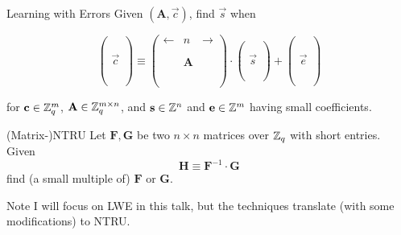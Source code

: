 \documentclass[xcolor=table,10pt,aspectratio=169]{beamer}
\begin{document}
\begin{frame}[label={sec:org35ba1be}]{Learning with Errors}
Given \((\mathbf{A},\vec{c})\), find \(\vec{s}\) when

\[
\left(\begin{array}{c}
\\
\\
\\ 
\vec{c} \\
\\
\\
\\
\end{array} \right) \equiv \left(
\begin{array}{ccc}
\leftarrow & n & \rightarrow \\
\\
\\ 
& \mathbf{A} & \\
\\
\\
\\
\end{array} \right) \cdot \left( \begin{array}{c}
\\\
\\
\vec{s} \\
\\
\\
\end{array} \right) + \left(
\begin{array}{c}
\\
\\
\\ 
\vec{e} \\
\\
\\
\\
\end{array} 
\right)
\]

for \(\mathbf{c} \in \mathbb{Z}_q^{m}\), \(\mathbf{A} \in \mathbb{Z}_q^{m \times n}\), and \(\mathbf{s} \in \mathbb{Z}^{n}\) and \(\mathbf{e} \in \mathbb{Z}^{m}\) having small coefficients.
\end{frame}

\begin{frame}[label={sec:orgd3751d7}]{(Matrix-)NTRU}
Let \(\mathbf{F}, \mathbf{G}\) be two \(n \times n\) matrices over \(\mathbb{Z}_q\) with short entries. Given
\[\mathbf{H} \equiv \mathbf{F}^{-1} \cdot \mathbf{G}\]
find (a small multiple of) \(\mathbf{F}\) or \(\mathbf{G}\).

\pause

\begin{block}{Note}
I will focus on LWE in this talk, but the techniques translate (with some modifications) to NTRU.
\end{block}
\end{frame}
\end{document}
